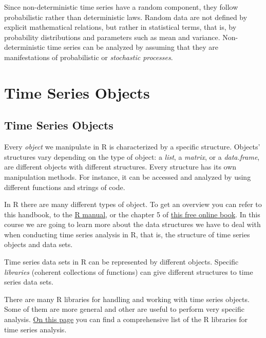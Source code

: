 \documentclass[
]{article}
\begin{document}
Since non-deterministic time series have a random component, they follow probabilistic rather than deterministic laws. Random data are not defined by explicit mathematical relations, but rather in statistical terms, that is, by probability distributions and parameters such as mean and variance. Non-deterministic time series can be analyzed by assuming that they are manifestations of probabilistic or \emph{stochastic processes}.

\hypertarget{time-series-objects}{%
\section{Time Series Objects}\label{time-series-objects}}

\hypertarget{time-series-objects-1}{%
\subsection{Time Series Objects}\label{time-series-objects-1}}

Every \emph{object} we manipulate in R is characterized by a specific structure. Objects' structures vary depending on the type of object: a \emph{list}, a \emph{matrix}, or a \emph{data.frame}, are different objects with different structures. Every structure has its own manipulation methods. For instance, it can be accessed and analyzed by using different functions and strings of code.

In R there are many different types of object. To get an overview you can refer to this handbook, to the \href{https://cran.r-project.org/doc/manuals/r-release/R-intro.html}{R manual}, or the chapter 5 of \href{https://rc2e.com/datastructures}{this free online book}. In this course we are going to learn more about the data structures we have to deal with when conducting time series analysis in R, that is, the structure of time series objects and data sets.

Time series data sets in R can be represented by different objects. Specific \emph{libraries} (coherent collections of functions) can give different structures to time series data sets.

There are many R libraries for handling and working with time series objects. Some of them are more general and other are useful to perform very specific analysis. \href{https://cran.r-project.org/web/views/TimeSeries.html}{On this page} you can find a comprehensive list of the R libraries for time series analysis.
\end{document}
